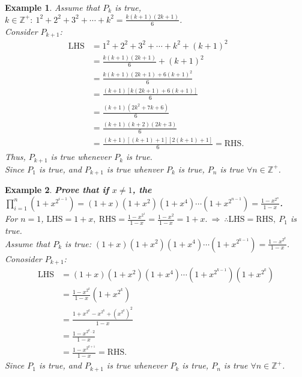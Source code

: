\documentclass[12pt, a4paper]{article}
\newtheorem{example}{Example}[subsection]
\begin{document}
\begin{enumerate}
\begin{example}
    Assume that $P_k$ is true, $k \in \mathbb{Z}^+:\ 1^2+2^2+3^2+\cdots+k^2=\frac{k(k+1)(2k+1)}{6}$.\\
    Consider $P_{k+1}$: 
    $$\begin{aligned}
      \text{LHS}&=1^2+2^2+3^2+\cdots+k^2+(k+1)^2\\
      &=\frac{k(k+1)(2k+1)}{6}+(k+1)^2\\
      &=\frac{k(k+1)(2k+1)+6(k+1)^2}{6}\\
      &=\frac{(k+1)[k(2k+1)+6(k+1)]}{6}\\
      &=\frac{(k+1)(2k^2+7k+6)}{6}\\
      &=\frac{(k+1)(k+2)(2k+3)}{6}\\
      &=\frac{(k+1)[(k+1)+1][2(k+1)+1]}{6}=\text{RHS}.
    \end{aligned}$$
    Thus, $P_{k+1}$ is true whenever $P_k$ is true. \\
    Since $P_1$ is true, and $P_{k+1}$ is true whenver $P_k$ is true, $P_n$ is true $\forall n \in \mathbb{Z}^+$.
  \end{example}
  \begin{example}
    \textbf{Prove that if $x\neq 1$, the $\prod\limits_{i=1}^{n}(1+x^{2^{i-1}})=(1+x)(1+x^2)(1+x^4)\cdots (1+x^{2^{n-1}})=\frac{1-x^{2^n}}{1-x}$.}\\
    For $n=1$, $\text{LHS}=1+x,\ \text{RHS}=\frac{1-x^{2^1}}{1-x}=\frac{1-x^2}{1-x}=1+x.\ \Rightarrow\ \therefore \text{LHS}=\text{RHS},\ P_1$ is true. \\
    Assume that $P_k$ is true: $(1+x)(1+x^2)(1+x^4)\cdots (1+x^{2^{k-1}})=\frac{1-x^{2^k}}{1-x}$.\\
    Conosider $P_{k+1}$: 
    $$\begin{aligned}
      \text{LHS}&=(1+x)(1+x^2)(1+x^4)\cdots (1+x^{2^{k-1}})(1+x^{2^{k}})\\
      &=\frac{1-x^{2^k}}{1-x}(1+x^{2^{k}})\\
      &=\frac{1+x^{2^k}-x^{2^k}+(x^{2^k})^2}{1-x}\\
      &=\frac{1-x^{2^k\cdot 2}}{1-x}\\
      &=\frac{1-x^{2^{k+1}}}{1-x}=\text{RHS}.
    \end{aligned}$$
    Since $P_1$ is true, and $P_{k+1}$ is true whenever $P_k$ is true, $P_n$ is true $\forall n \in\mathbb{Z}^+$.
  \end{example}
\end{enumerate}
\end{document}
